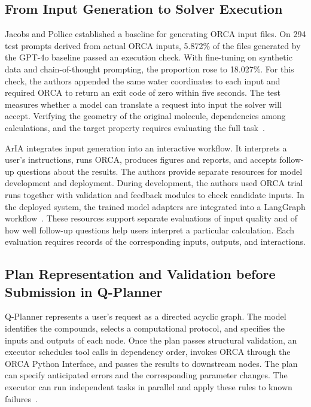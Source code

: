 \documentclass[a4paper,11pt]{article}
\begin{document}
\subsection{From Input Generation to Solver Execution}
Jacobs and Pollice established a baseline for generating ORCA input files.
On 294 test prompts derived from actual ORCA inputs,
5.872\% of the files generated by the GPT-4o baseline passed an execution check.
With fine-tuning on synthetic data and chain-of-thought prompting,
the proportion rose to 18.027\%.
For this check, the authors appended the same water coordinates to each input
and required ORCA to return an exit code of zero within five seconds.
The test measures whether a model can translate a request into input the solver
will accept.
Verifying the geometry of the original molecule, dependencies among calculations,
and the target property requires evaluating the full task~\cite{input}.

ArIA integrates input generation into an interactive workflow.
It interprets a user's instructions, runs ORCA, produces figures and reports,
and accepts follow-up questions about the results.
The authors provide separate resources for model development and deployment.
During development, the authors used ORCA trial runs together with validation
and feedback modules to check candidate inputs.
In the deployed system, the trained model adapters are integrated into a
LangGraph workflow~\cite{aria}.
These resources support separate evaluations of input quality and of how well
follow-up questions help users interpret a particular calculation.
Each evaluation requires records of the corresponding inputs, outputs, and
interactions.

\subsection{Plan Representation and Validation before Submission in Q-Planner}
Q-Planner represents a user's request as a directed acyclic graph.
The model identifies the compounds, selects a computational protocol, and
specifies the inputs and outputs of each node.
Once the plan passes structural validation, an executor schedules tool calls
in dependency order, invokes ORCA through the ORCA Python Interface, and
passes the results to downstream nodes.
The plan can specify anticipated errors and the corresponding parameter changes.
The executor can run independent tasks in parallel and apply these rules to
known failures~\cite{qplanner}.
\end{document}
